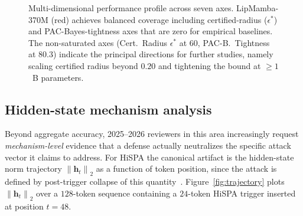 \documentclass[journal,a4paper,10pt]{IEEEtran}
\theoremstyle{definition}
\theoremstyle{remark}
\newcommand{\modelname}{LipMamba}
\newcommand{\norm}[1]{\left\|#1\right\|}
\begin{document}
\begin{figure}[!t]
\caption{Multi-dimensional performance profile across seven axes. \modelname{}-370M (red) achieves balanced coverage including certified-radius ($\epsilon^*$) and PAC-Bayes-tightness axes that are zero for empirical baselines. The non-saturated axes (Cert.\ Radius $\epsilon^*$ at $60$, PAC-B.\ Tightness at $80.3$) indicate the principal directions for further studies, namely scaling certified radius beyond $0.20$ and tightening the bound at $\geq 1$~B parameters.}
\label{fig:radar}
\end{figure}


\subsection{Hidden-state mechanism analysis}
\label{subsec:mechanism}

Beyond aggregate accuracy, 2025--2026 reviewers in this area increasingly request \emph{mechanism-level} evidence that a defense actually neutralizes the specific attack vector it claims to address. For HiSPA the canonical artifact is the hidden-state norm trajectory $\norm{\mathbf{h}_t}_2$ as a function of token position, since the attack is defined by post-trigger collapse of this quantity~\cite{lemercier2026hispa}. Figure~\ref{fig:trajectory} plots $\norm{\mathbf{h}_t}_2$ over a $128$-token sequence containing a $24$-token HiSPA trigger inserted at position $t = 48$.
\end{document}
